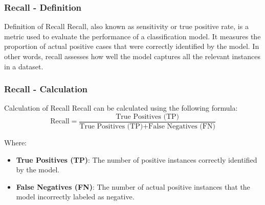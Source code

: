 \documentclass{beamer}
\begin{document}
\begin{frame}[fragile]
    \frametitle{Recall - Definition}
    \begin{block}{Definition of Recall}
        Recall, also known as sensitivity or true positive rate, is a metric used to evaluate the performance of a classification model. It measures the proportion of actual positive cases that were correctly identified by the model. In other words, recall assesses how well the model captures all the relevant instances in a dataset.
    \end{block}
\end{frame}

\begin{frame}[fragile]
    \frametitle{Recall - Calculation}
    \begin{block}{Calculation of Recall}
        Recall can be calculated using the following formula:
        \begin{equation}
            \text{Recall} = \frac{\text{True Positives (TP)}}{\text{True Positives (TP)} + \text{False Negatives (FN)}}
        \end{equation}
        
        Where:
        \begin{itemize}
            \item \textbf{True Positives (TP)}: The number of positive instances correctly identified by the model.
            \item \textbf{False Negatives (FN)}: The number of actual positive instances that the model incorrectly labeled as negative.
        \end{itemize}
    \end{block}
\end{frame}
\end{document}
